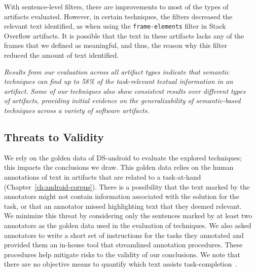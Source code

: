 With sentence-level filters, there are improvements to most of the types of artifacts evaluated. 
However, in certain techniques, the filters decreased the relevant text identified, as when using the  \texttt{frame-elements} filter in Stack Overflow artifacts.
It is possible that the text in these artifacts lacks any of the frames that we defined as meaningful, and thus, the reason why this filter reduced the amount of text identified.  





\medskip
\begin{bluequote}
    \textit{Results from our evaluation across all artifact types indicate that 
    semantic techniques can find up to 58\% of the task-relevant textual information in an artifact. 
    Some of our techniques also show consistent results over different types of artifacts, providing initial evidence on the generalizability of semantic-based techniques 
     across a variety of software artifacts.}
\end{bluequote}







\subsection{Threats to Validity}




We rely on the golden data of \acs{DS-android}
to evaluate the explored techniques; this impacts the 
conclusions we draw.
This golden data  relies on the
human annotations of text in artifacts that
are related to a task-at-hand (Chapter~\ref{ch:android-corpus}).
There is a possibility that the text marked by the annotators might not contain information 
associated with the solution for the task, or that an annotator missed highlighting
text that they deemed relevant.
We minimize this threat by considering only the 
sentences marked  by at least two annotators as the golden data used in the evaluation of techniques.
We also asked annotators to write a short set of instructions for the tasks they annotated
and provided them an in-house tool that streamlined annotation procedures.
These procedures help mitigate  risks to the validity of our conclusions. We note that
there are no objective means to quantify which text assists task-completion~\cite{Saracevic2007b, Saracevic2007c}. 






